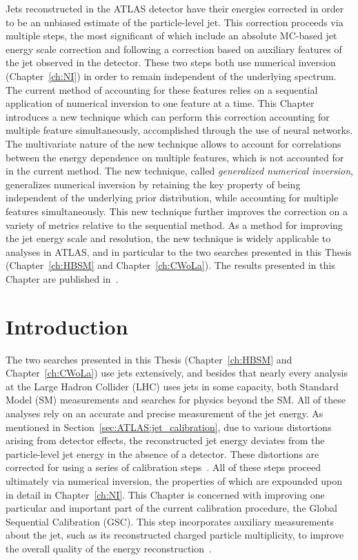 Jets reconstructed in the ATLAS detector have their energies corrected in order to be an unbiased estimate of the particle-level jet.
This correction proceeds via multiple steps, the most significant of which include an absolute MC-based jet energy scale correction and following a correction based on auxiliary features of the jet observed in the detector.
These two steps both use numerical inversion (Chapter~\ref{ch:NI}) in order to remain independent of the underlying spectrum.
The current method of accounting for these features relies on a sequential application of numerical inversion to one feature at a time.
This Chapter introduces a new technique which can perform this correction accounting for multiple feature simultaneously, accomplished through the use of neural networks.
The multivariate nature of the new technique allows to account for correlations between the energy dependence on multiple features, which is not accounted for in the current method.
The new technique, called \textit{generalized numerical inversion}, generalizes numerical inversion by retaining the key property of being independent of the underlying prior distribution, while accounting for multiple features simultaneously.
This new technique further improves the correction on a variety of metrics relative to the sequential method.
As a method for improving the jet energy scale and resolution, the new technique is widely applicable to analyses in ATLAS, and in particular to the two searches presented in this Thesis (Chapter~\ref{ch:HBSM} and Chapter~\ref{ch:CWoLa}).
The results presented in this Chapter are published in~\cite{ATL-PHYS-PUB-2018-013}.

\section{Introduction}
\label{sec:GenNI:intro}
The two searches presented in this Thesis (Chapter~\ref{ch:HBSM} and Chapter~\ref{ch:CWoLa}) use jets extensively, and besides that nearly every analysis at the Large Hadron Collider (LHC) uses jets in some capacity, both Standard Model (SM) measurements and searches for physics beyond the SM.
All of these analyses rely on an accurate and precise measurement of the jet energy.
As mentioned in Section~\ref{sec:ATLAS:jet_calibration}, due to various distortions arising from detector effects, the reconstructed jet energy deviates from the particle-level jet energy in the absence of a detector.
These distortions are corrected for using a series of calibration steps~\cite{PERF-2016-04,Aad:2011he,Schwartzman:2015ada}.
All of these steps proceed ultimately via numerical inversion, the properties of which are expounded upon in detail in Chapter~\ref{ch:NI}.
This Chapter is concerned with improving one particular and important part of the current calibration procedure, the Global Sequential Calibration (GSC).
This step incorporates auxiliary measurements about the jet, such as its reconstructed charged particle multiplicity, to improve the overall quality of the energy reconstruction~\cite{ATLAS-CONF-2015-002}.

